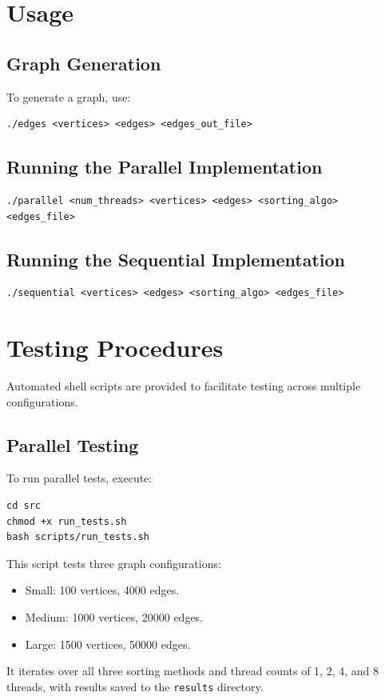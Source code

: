 \documentclass[11pt]{article}
\begin{document}
\section{Usage}
\subsection{Graph Generation}
To generate a graph, use:
\begin{lstlisting}
./edges <vertices> <edges> <edges_out_file>
\end{lstlisting}

\subsection{Running the Parallel Implementation}
\begin{lstlisting}
./parallel <num_threads> <vertices> <edges> <sorting_algo> <edges_file>
\end{lstlisting}

\subsection{Running the Sequential Implementation}
\begin{lstlisting}
./sequential <vertices> <edges> <sorting_algo> <edges_file>
\end{lstlisting}

\section{Testing Procedures}
Automated shell scripts are provided to facilitate testing across multiple configurations.

\subsection{Parallel Testing}
To run parallel tests, execute:
\begin{lstlisting}
cd src
chmod +x run_tests.sh
bash scripts/run_tests.sh
\end{lstlisting}
This script tests three graph configurations:
\begin{itemize}
    \item Small: 100 vertices, 4000 edges.
    \item Medium: 1000 vertices, 20000 edges.
    \item Large: 1500 vertices, 50000 edges.
\end{itemize}
It iterates over all three sorting methods and thread counts of 1, 2, 4, and 8 threads, with results saved to the \texttt{results} directory.
\end{document}
